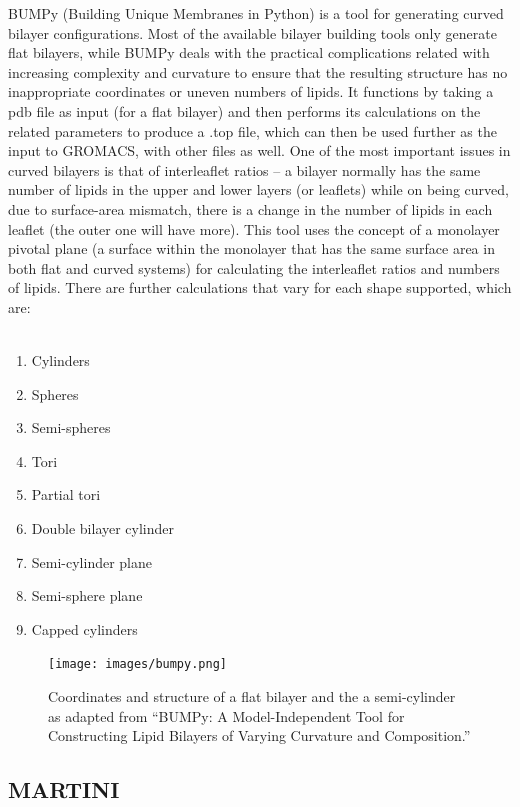 \documentclass[12pt, a4paper]{report}
\begin{document}
BUMPy (Building Unique Membranes in Python) is a tool for generating curved bilayer configurations. Most of the available bilayer building tools only generate flat bilayers, while BUMPy deals with the practical complications related with increasing complexity and curvature to ensure that the resulting structure has no inappropriate coordinates or uneven numbers of lipids. It functions by taking a pdb file as input (for a flat bilayer) and then performs its calculations on the related parameters to produce a .top file, which can then be used further as the input to GROMACS, with other files as well. One of the most important issues in curved bilayers is that of interleaflet ratios – a bilayer normally has the same number of lipids in the upper and lower layers (or leaflets) while on being curved, due to surface-area mismatch, there is a change in the number of lipids in each leaflet (the outer one will have more). This tool uses the concept of a monolayer pivotal plane (a surface within the monolayer that has the same surface area in both flat and curved systems) for calculating the interleaflet ratios and numbers of lipids. There are further calculations that vary for each shape supported, which are: 
\\~\\ 
\begin{enumerate}
    \item Cylinders 
    \item Spheres 
    \item Semi-spheres 
    \item Tori 
    \item Partial tori 
    \item Double bilayer cylinder 
    \item Semi-cylinder plane 
    \item Semi-sphere plane 
    \item Capped cylinders 
\end{enumerate} 

\begin{figure}[h]
    \texttt{[image: images/bumpy.png]} 
    \centering 
    \caption{Coordinates and structure of a flat bilayer and the a semi-cylinder as adapted from “BUMPy: A Model-Independent Tool for Constructing Lipid Bilayers of Varying Curvature and Composition.”} 
    \centering
\end{figure} 


\newpage
\subsection*{MARTINI} 
\end{document}
